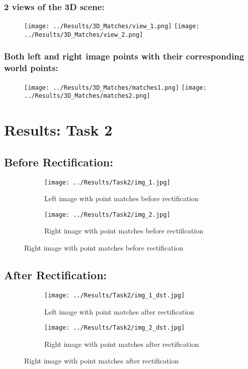 \documentclass{article}
\begin{document}
\subsubsection{2 views of the 3D scene:}
\begin{figure}[H]
    \centering
    \texttt{[image: ../Results/3D\_Matches/view\_1.png]}
    \texttt{[image: ../Results/3D\_Matches/view\_2.png]}
    \caption{}
\end{figure}

\subsubsection{Both left and right image points with their corresponding world points:}
\begin{figure}[H]
    \centering
    \texttt{[image: ../Results/3D\_Matches/matches1.png]}
    \texttt{[image: ../Results/3D\_Matches/matches2.png]}
    \caption{}
\end{figure}

\section{Results: Task 2}
\subsection{Before Rectification: }
\begin{figure}[H]
    \centering
    \begin{subfigure}{0.49\linewidth}
        \centering
        \texttt{[image: ../Results/Task2/img\_1.jpg]}
        \caption{Left image with point matches before rectification}
    \end{subfigure}
    \begin{subfigure}{0.49\linewidth}
        \centering
        \texttt{[image: ../Results/Task2/img\_2.jpg]}
        \caption{Right image with point matches before rectification}
    \end{subfigure}
\end{figure}

\subsection{After Rectification: }
\begin{figure}[H]
    \centering
    \begin{subfigure}{0.45\linewidth}
        \centering
        \texttt{[image: ../Results/Task2/img\_1\_dst.jpg]}
        \caption{Left image with point matches after rectification}
    \end{subfigure}
    \begin{subfigure}{0.49\linewidth}
        \centering
        \texttt{[image: ../Results/Task2/img\_2\_dst.jpg]}
        \caption{Right image with point matches after rectification}
    \end{subfigure}
\end{figure}
\end{document}
